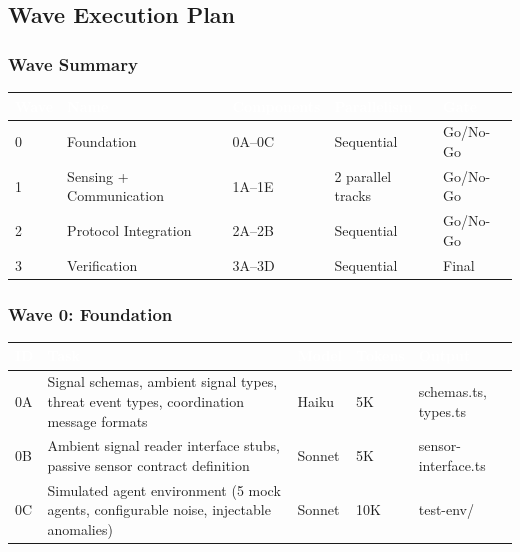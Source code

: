 \documentclass[11pt,letterpaper]{article}
\newcommand{\tableheader}[1]{\textbf{\sffamily\textcolor{white}{#1}}}
\begin{document}
\subsection{Wave Execution Plan}

\subsubsection{Wave Summary}

\begin{center}
\begin{tabularx}{\textwidth}{C{1cm}L{3.5cm}C{2cm}C{2cm}C{1.5cm}}
\toprule
{}
\tableheader{Wave} & \tableheader{Name} & \tableheader{Components} & \tableheader{Parallelism} & \tableheader{Gate} \\
 & Foundation & 0A--0C & Sequential & Go/No-Go \\
1 & Sensing + Communication & 1A--1E & 2 parallel tracks & Go/No-Go \\
2 & Protocol Integration & 2A--2B & Sequential & Go/No-Go \\
3 & Verification & 3A--3D & Sequential & Final \\
\bottomrule
\end{tabularx}
\end{center}

\subsubsection{Wave 0: Foundation}

\begin{center}
\begin{tabularx}{\textwidth}{C{0.8cm}L{3.5cm}L{1.5cm}C{1.2cm}X}
\toprule
{}
\tableheader{ID} & \tableheader{Task} & \tableheader{Model} & \tableheader{Tokens} & \tableheader{Output} \\
\midrule
0A & Signal schemas, ambient signal types, threat event types, coordination message formats & Haiku & 5K & schemas.ts, types.ts \\
0B & Ambient signal reader interface stubs, passive sensor contract definition & Sonnet & 5K & sensor-interface.ts \\
0C & Simulated agent environment (5 mock agents, configurable noise, injectable anomalies) & Sonnet & 10K & test-env/ \\
\bottomrule
\end{tabularx}
\end{center}
\end{document}

